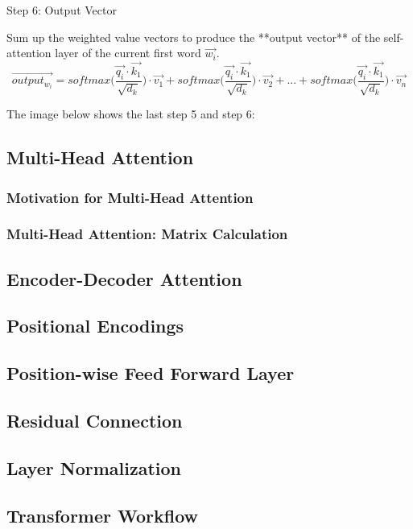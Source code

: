 Step 6: Output Vector

Sum up the weighted value vectors to produce the **output vector** of the self-attention layer of the current first word $\overrightarrow{w_i}$.
$$
\overrightarrow{output_{w_i}} = softmax \Bigg(
\frac {\overrightarrow{q_i} \cdot \overrightarrow{k_1}} {\sqrt{d_k}} \Bigg) \cdot \overrightarrow{v_1} +
softmax \Bigg(\frac {\overrightarrow{q_i} \cdot \overrightarrow{k_1}} {\sqrt{d_k}} \Bigg) \cdot \overrightarrow{v_2} + ... +
softmax \Bigg(\frac {\overrightarrow{q_i} \cdot \overrightarrow{k_1}} {\sqrt{d_k}} \Bigg) \cdot \overrightarrow{v_n}
$$

The image below shows the last step 5 and step 6:

\subsection{Multi-Head Attention}

\subsubsection{Motivation for Multi-Head Attention}

\subsubsection{Multi-Head Attention: Matrix Calculation}

\subsection{Encoder-Decoder Attention}

\subsection{Positional Encodings}

\subsection{Position-wise Feed Forward Layer}

\subsection{Residual Connection}

\subsection{Layer Normalization}


\subsection{Transformer Workflow}